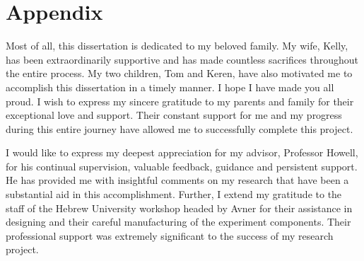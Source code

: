 \documentclass[\main/master.tex]{subfiles}
\begin{document}
\newspacing
\chapter{Appendix}\label{chapter:Appendix}
Most of all, this dissertation is dedicated to my beloved family. My wife, Kelly, has been extraordinarily supportive and has made countless sacrifices throughout the entire
process. My two children, Tom and Keren, have also motivated me to accomplish this dissertation in a timely manner. I hope I have made you all proud. I wish to express my
sincere gratitude to my parents and family for their exceptional love and support. Their constant support for me and my progress during this entire journey have allowed me
to successfully complete this project. 
\par\noindent
I would like to express my deepest appreciation for my advisor, Professor Howell, for his continual supervision, valuable feedback, guidance and persistent support. He has provided me with insightful comments on my research that have been a substantial aid in this accomplishment. Further, I extend my gratitude to the staff of the Hebrew University workshop headed by Avner for their assistance in designing and their careful manufacturing of the experiment components. Their professional support was extremely significant to the success of my research project.
\end{document}
